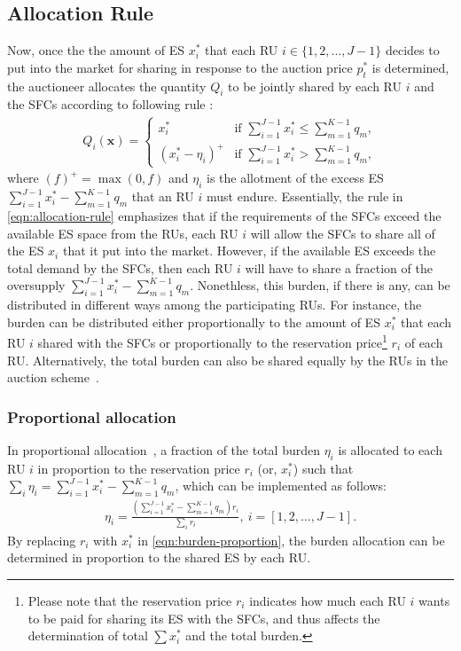 \documentclass[journal,10pt]{IEEEtran}
\begin{document}
\subsection{Allocation Rule}\label{sec:allocation} Now, once the the amount of ES $x_i^*$ that each RU $i\in\{1,2,\hdots,J-1\}$ decides to put into the market for sharing in response to the auction price $p_t^*$ is determined, the auctioneer allocates the quantity $Q_i$ to be jointly shared by each RU $i$ and the SFCs according to following rule \cite{Huang-doubleauction:2002}:
\begin{eqnarray}
Q_i(\mathbf{x}) = \begin{cases}
x_i^* & \text{if $\sum_{i=1}^{J-1} x_i^*\leq\sum_{m=1}^{K-1} q_m$},\\
(x_i^* - \eta_i)^{+} & \text{if $\sum_{i=1}^{J-1}x_i^*>\sum_{m=1}^{K-1} q_m$},
\end{cases}
\label{eqn:allocation-rule}
\end{eqnarray}
where $(f)^{+} = \max(0,f)$ and $\eta_i$ is the allotment of the excess ES $\sum_{i=1}^{J-1}x_i^*-\sum_{m=1}^{K-1}q_m$ that an RU $i$ must endure. Essentially, the rule in \eqref{eqn:allocation-rule} emphasizes that if the requirements of the SFCs exceed the available ES space from the RUs, each RU $i$ will allow the SFCs to share all of the ES $x_i$ that it put into the market. However, if the available ES exceeds the total demand by the SFCs, then each RU $i$ will have to share a fraction of the oversupply $\sum_{i=1}^{J-1}x_i^* - \sum_{m=1}^{K-1}q_m$. Nonethless, this burden, if there is any, can be distributed in different ways among the participating RUs. For instance, the burden can be distributed either proportionally to the amount of ES $x_i^*$ that each RU $i$ shared with the SFCs or proportionally to the reservation price\footnote{Please note that the reservation price $r_i$ indicates how much each RU $i$ wants to be paid for sharing its ES with the SFCs, and thus affects the determination of total $\sum x_i^*$ and the total burden.} $r_i$ of each RU. Alternatively, the total burden can also be shared equally by the RUs in the auction scheme~\cite{Huang-doubleauction:2002}.

\subsubsection{Proportional allocation}\label{sec:Proportional allocation}In proportional allocation~\cite{Guojon:2012}, a fraction of the total burden $\eta_i$ is allocated to each RU $i$ in proportion to the reservation price $r_i$ (or, $x_i^*$) such that $\sum_i \eta_i = \sum_{i=1}^{J-1}x_i^* - \sum_{m=1}^{K-1}q_m$, which can be implemented as follows:
\begin{eqnarray}
\eta_i = \frac{\left(\sum_{i=1}^{J-1}x_i^* - \sum_{m=1}^{K-1}q_m\right)r_i}{\sum_i r_i},~i = [1, 2, \hdots, J-1].
\label{eqn:burden-proportion}
\end{eqnarray}
By replacing $r_i$ with $x_i^*$ in \eqref{eqn:burden-proportion}, the burden allocation can be determined in proportion to the shared ES by each RU.
\end{document}
